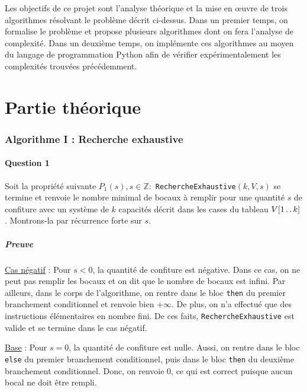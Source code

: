 \documentclass[12pt,a4paper]{article}
\newcommand{\tdots}{\mathinner {\ldotp \ldotp}}
\begin{document}
\bigskip
Les objectifs de ce projet sont l'analyse th\'eorique et la mise en \oe uvre de trois algorithmes r\'esolvant le probl\`eme d\'ecrit ci-dessus. Dans un premier temps, on formalise le probl\`eme et propose plusieurs algorithmes dont on fera l'analyse de complexit\'e. Dans un deuxi\`eme temps, on impl\'emente ces algorithmes au moyen du langage de programmation Python afin de v\'erifier exp\'erimentalement les complexit\'es trouv\'ees pr\'ec\'edemment.

\newpage
\part{Partie th\'eorique}

\section{Algorithme I : Recherche exhaustive}

\subsection*{Question 1}
Soit la propri\'et\'e suivante \( P_{1}(s), s \in \mathbb{Z} : \) \texttt{RechercheExhaustive}$(k,V,s)$ se termine et renvoie le nombre minimal de bocaux \`a remplir pour une quantit\'e $s$ de confiture avec un syst\`eme de $k$ capacit\'es d\'ecrit dans les cases du tableau $V[1 \tdots k]$.
Montrons-la par r\'ecurrence forte sur $s$.

\subsubsection*{Preuve}
\underline{Cas n\'egatif} : Pour $s < 0$, la quantit\'e de confiture est n\'egative. Dans ce cas, on ne peut pas remplir les bocaux et on dit que le nombre de bocaux est infini. 
Par ailleurs, dans le corps de l'algorithme, on rentre dans le bloc \texttt{then} du premier branchement conditionnel et renvoie bien $+\infty$. De plus, on n'a effectu\'e que des instructions \'el\'ementaires en nombre fini.
De ces faits, \texttt{RechercheExhaustive} est valide et se termine dans le cas n\'egatif.

\medskip
\underline{Base} : Pour \( s = 0\), la quantit\'e de confiture est nulle. Aussi, on rentre dans le bloc \texttt{else} du premier branchement conditionnel, puis dans le bloc \texttt{then} du deuxi\`eme branchement conditionnel. Donc, on renvoie $0$, ce qui est correct puisque aucun bocal ne doit \^etre rempli.
\end{document}
